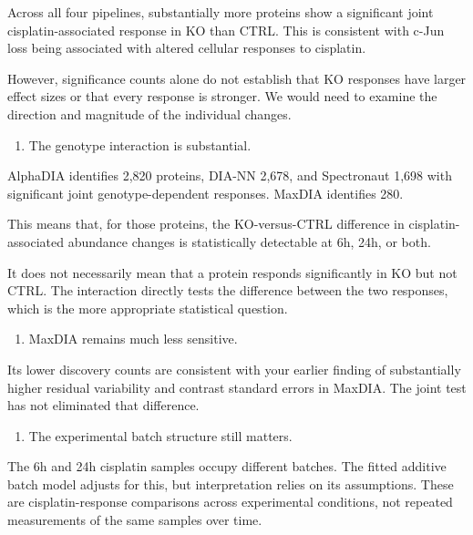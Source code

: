 \documentclass[
  10pt,
]{article}
\providecommand{\tightlist}{%
  \setlength{\itemsep}{0pt}\setlength{\parskip}{0pt}}
\begin{document}
Across all four pipelines, substantially more proteins show a
significant joint cisplatin-associated response in KO than CTRL. This is
consistent with c-Jun loss being associated with altered cellular
responses to cisplatin.

However, significance counts alone do not establish that KO responses
have larger effect sizes or that every response is stronger. We would
need to examine the direction and magnitude of the individual changes.

\begin{enumerate}
\def\labelenumi{\arabic{enumi}.}
\setcounter{enumi}{1}
\tightlist
\item
  The genotype interaction is substantial.
\end{enumerate}

AlphaDIA identifies 2,820 proteins, DIA-NN 2,678, and Spectronaut 1,698
with significant joint genotype-dependent responses. MaxDIA identifies
280.

This means that, for those proteins, the KO-versus-CTRL difference in
cisplatin-associated abundance changes is statistically detectable at
6h, 24h, or both.

It does not necessarily mean that a protein responds significantly in KO
but not CTRL. The interaction directly tests the difference between the
two responses, which is the more appropriate statistical question.

\begin{enumerate}
\def\labelenumi{\arabic{enumi}.}
\setcounter{enumi}{2}
\tightlist
\item
  MaxDIA remains much less sensitive.
\end{enumerate}

Its lower discovery counts are consistent with your earlier finding of
substantially higher residual variability and contrast standard errors
in MaxDIA. The joint test has not eliminated that difference.

\begin{enumerate}
\def\labelenumi{\arabic{enumi}.}
\setcounter{enumi}{3}
\tightlist
\item
  The experimental batch structure still matters.
\end{enumerate}

The 6h and 24h cisplatin samples occupy different batches. The fitted
additive batch model adjusts for this, but interpretation relies on its
assumptions. These are cisplatin-response comparisons across
experimental conditions, not repeated measurements of the same samples
over time.
\end{document}
